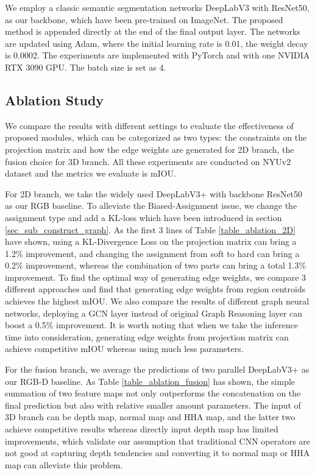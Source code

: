 ﻿\documentclass[journal]{IEEEtran}
\begin{document}
    We employ a classic semantic segmentation networks DeepLabV3 with ResNet50, as our backbone, which have been pre-trained on ImageNet. The proposed method is appended directly at the end of the final output layer. The networks are updated using Adam, where the initial learning rate is 0.01, the weight decay is 0.0002. The experiments are implemented with PyTorch and with one NVIDIA RTX 3090 GPU. The batch size is set as 4. 

    \subsection{Ablation Study}\label{sec_sub_ablation_study} 
    We compare the results with different settings to evaluate the effectiveness of proposed modules, which can be categorized as two types: the constraints on the projection matrix and how the edge weights are generated for 2D branch, the fusion choice for 3D branch. All these experiments are conducted on NYUv2 dataset and the metrics we evaluate is mIOU. 
    
    For 2D branch, we take the widely used DeepLabV3+ with backbone ResNet50 as our RGB baseline. To alleviate the Biased-Assignment issue, we change the assignment type and add a KL-loss which have been introduced in section \ref{sec_sub_construct_graph}. As the first 3 lines of Table \ref{table_ablation_2D} have shown, using a KL-Divergence Loss on the projection matrix can bring a 1.2\% improvement, and changing the assignment from soft to hard can bring a 0.2\% improvement, whereas the combination of two parts can bring a total 1.3\% improvement. To find the optimal way of generating edge weights, we compare 3 different approaches and find that generating edge weights from region centroids achieves the highest mIOU. We also compare the results of different graph neural networks, deploying a GCN layer instead of original Graph Reasoning layer can boost a 0.5\% improvement. It is worth noting that when we take the inference time into consideration, generating edge weights from projection matrix can achieve competitive mIOU whereas using much less parameters. 

    For the fusion branch, we average the predictions of two parallel DeepLabV3+ as our RGB-D baseline. As Table \ref{table_ablation_fusion} has shown, the simple summation of two feature maps not only outperforms the concatenation on the final prediction but also with relative smaller amount parameters. The input of 3D branch can be depth map, normal map and HHA map, and the latter two achieve competitive results whereas directly input depth map has limited improvements, which validate our assumption that traditional CNN operators are not good at capturing depth tendencies and converting it to normal map or HHA map can alleviate this problem.
\end{document}
